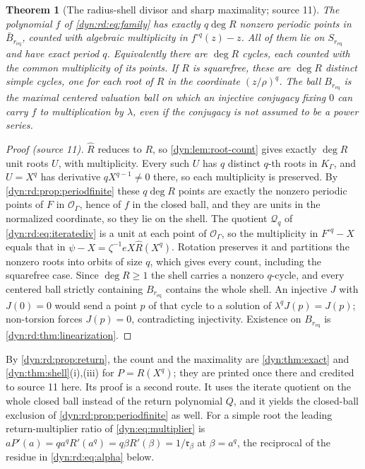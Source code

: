 \documentclass[11pt,letterpaper]{article}
\newtheorem{theorem}{Theorem}[section]
\theoremstyle{definition}
\theoremstyle{remark}
\newcommand{\OO}{\mathcal O}
\numberwithin{equation}{section}
\begin{document}
\begin{theorem}[The radius-shell divisor and sharp maximality; source 11]
\label{dyn:rd:thm:shell}
The polynomial $f$ of \eqref{dyn:rd:eq:family} has exactly $q\deg R$
nonzero periodic points in $\bar B_{r_{\mathrm{eq}}}$, counted with
algebraic multiplicity in $f^{\circ q}(z)-z$. All of them lie on
$S_{r_{\mathrm{eq}}}$ and have exact period $q$. Equivalently there are
$\deg R$ cycles, each counted with the common multiplicity of its points.
If $R$ is squarefree, these are $\deg R$ distinct simple cycles, one for
each root of $R$ in the coordinate $(z/\rho)^{q}$. The ball
$B_{r_{\mathrm{eq}}}$ is the maximal centered valuation ball on which an
injective conjugacy fixing $0$ can carry $f$ to multiplication by
$\lambda$, even if the conjugacy is not assumed to be a power series.
\end{theorem}
\begin{proof}[Proof \textup{(source 11)}]
$\widehat R$ reduces to $R$, so \cref{dyn:lem:root-count} gives exactly
$\deg R$ unit roots $U$, with multiplicity. Every such $U$ has $q$ distinct
$q$-th roots in $K_\Gamma$, and $U=X^{q}$ has derivative $qX^{q-1}\ne0$
there, so each multiplicity is preserved. By
\cref{dyn:rd:prop:periodfinite} these $q\deg R$ points are exactly the
nonzero periodic points of $F$ in $\OO_\Gamma$, hence of $f$ in the closed
ball, and they are units in the normalized coordinate, so they lie on the
shell. The quotient $\mathcal Q_q$ of \eqref{dyn:rd:eq:iteratediv} is a unit
at each point of $\OO_\Gamma$, so the multiplicity in $F^{\circ q}-X$
equals that in $\psi-X=\zeta^{-1}eX\widehat R(X^{q})$. Rotation preserves
it and partitions the nonzero roots into orbits of size $q$, which gives
every count, including the squarefree case. Since $\deg R\ge1$ the shell
carries a nonzero $q$-cycle, and every centered ball strictly containing
$B_{r_{\mathrm{eq}}}$ contains the whole shell. An injective $J$ with
$J(0)=0$ would send a point $p$ of that cycle to a solution of
$\lambda^{q}J(p)=J(p)$; non-torsion forces $J(p)=0$, contradicting
injectivity. Existence on $B_{r_{\mathrm{eq}}}$ is
\cref{dyn:rd:thm:linearization}.
\end{proof}

By \cref{dyn:rd:prop:return}, the count and the maximality are
\cref{dyn:thm:exact} and \cref{dyn:thm:shell}(i),(iii) for $P=R(X^{q})$;
they are printed once there and credited to source 11 here. Its proof is a
second route. It uses the iterate quotient on the whole closed ball instead
of the return polynomial $Q$, and it yields the closed-ball exclusion of
\cref{dyn:rd:prop:periodfinite} as well. For a simple root the leading
return-multiplier ratio of \eqref{dyn:eq:multiplier} is
$aP'(a)=qa^{q}R'(a^{q})=q\beta R'(\beta)=1/\mathfrak r_\beta$ at
$\beta=a^{q}$, the reciprocal of the residue in \eqref{dyn:rd:eq:alpha}
below.
\end{document}
